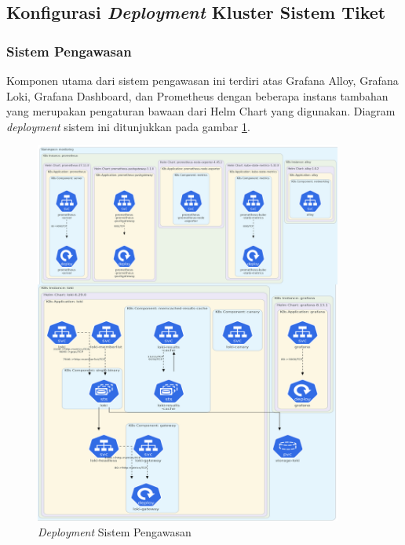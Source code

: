 \subsection{Konfigurasi \textit{Deployment} Kluster Sistem Tiket}

\subsubsection{Sistem Pengawasan}

Komponen utama dari sistem pengawasan ini terdiri atas Grafana Alloy, Grafana Loki, Grafana Dashboard, dan Prometheus dengan beberapa instans tambahan yang merupakan pengaturan bawaan dari Helm Chart yang digunakan. Diagram \textit{deployment} sistem ini ditunjukkan pada gambar \ref{fig:deployment-monitoring}.

\begin{figure}[htbp!]
    \centering
    \includegraphics[width=0.9\textwidth]{resources/chapter-4/monitoring-1.png}
    \caption{\textit{Deployment} Sistem Pengawasan}
    \label{fig:deployment-monitoring}
\end{figure}

\pagebreak

